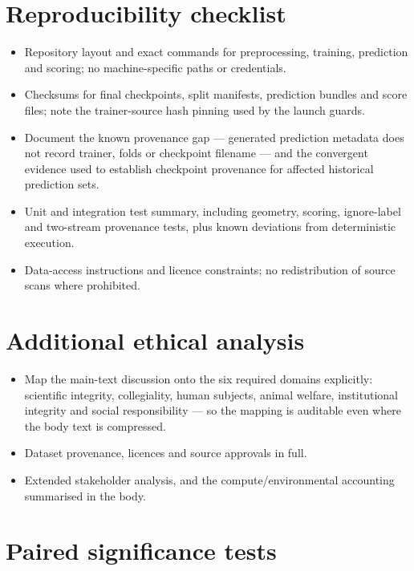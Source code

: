 \section{Reproducibility checklist}

\begin{itemize}
  \item Repository layout and exact commands for preprocessing, training, prediction and
  scoring; no machine-specific paths or credentials.
  \item Checksums for final checkpoints, split manifests, prediction bundles and score files;
  note the trainer-source hash pinning used by the launch guards.
  \item Document the known provenance gap --- generated prediction metadata does not record
  trainer, folds or checkpoint filename --- and the convergent evidence used to establish
  checkpoint provenance for affected historical prediction sets.
  \item Unit and integration test summary, including geometry, scoring, ignore-label and
  two-stream provenance tests, plus known deviations from deterministic execution.
  \item Data-access instructions and licence constraints; no redistribution of source scans
  where prohibited.
\end{itemize}

\section{Additional ethical analysis}

\begin{itemize}
  \item Map the main-text discussion onto the six required domains explicitly: scientific
  integrity, collegiality, human subjects, animal welfare, institutional integrity and social
  responsibility --- so the mapping is auditable even where the body text is compressed.
  \item Dataset provenance, licences and source approvals in full.
  \item Extended stakeholder analysis, and the compute/environmental accounting summarised in
  the body.
\end{itemize}

\section{Paired significance tests}


